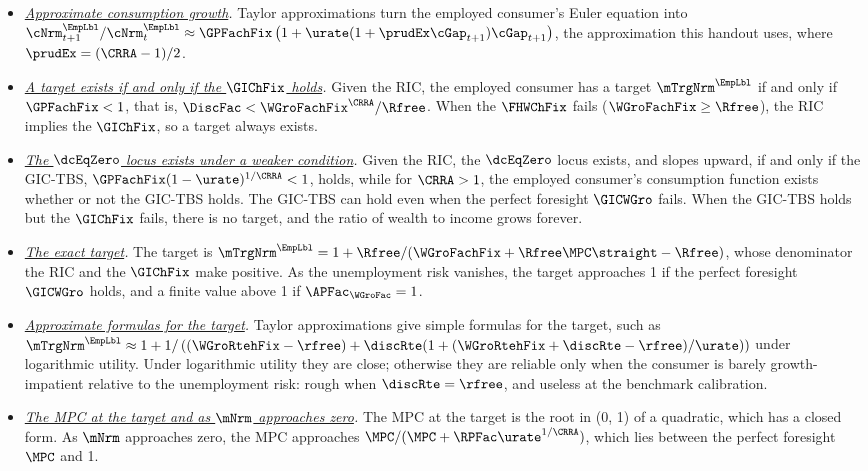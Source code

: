 \documentclass{econark}
\begin{document}
\begin{itemize}
\item \emph{\hyperref[sec:CGroApprox]{Approximate consumption growth}.}  Taylor approximations turn the employed consumer's Euler equation into ${\cNrm}^{\EmpLbl}_{t+1}/{\cNrm}^{\EmpLbl}_{t} \approx \GPFachFix\left(1+\urate(1+\prudEx\cGap_{t+1})\cGap_{t+1}\right)$, the approximation this handout uses, where $\prudEx = (\CRRA-1)/2$.
\item \emph{\hyperref[sec:mTargExists]{A target exists if and only if the $\GIChFix$ holds}.}  Given the RIC, the employed consumer has a target $\mTrgNrm^{\EmpLbl}$ if and only if $\GPFachFix < 1$, that is, $\DiscFac < \WGroFachFix^{\CRRA}/\Rfree$.  When the $\FHWChFix$ fails ($\WGroFachFix \geq \Rfree$), the RIC implies the $\GIChFix$, so a target always exists.
\item \emph{\hyperref[sec:TractableBufferStock-cLocusExists]{The $\dcEqZero$ locus exists under a weaker condition}.}  Given the RIC, the $\dcEqZero$ locus exists, and slopes upward, if and only if the GIC-TBS, $\GPFachFix(1-\urate)^{1/\CRRA} < 1$, holds, while for $\CRRA > 1$, the employed consumer's consumption function exists whether or not the GIC-TBS holds.  The GIC-TBS can hold even when the perfect foresight $\GICWGro$ fails.  When the GIC-TBS holds but the $\GIChFix$ fails, there is no target, and the ratio of wealth to income grows forever.
\item \emph{\hyperref[sec:mTargExact]{The exact target}.}  The target is $\mTrgNrm^{\EmpLbl} = 1 + \Rfree/(\WGroFachFix+\Rfree\MPC\straight-\Rfree)$, whose denominator the RIC and the $\GIChFix$ make positive.  As the unemployment risk vanishes, the target approaches 1 if the perfect foresight $\GICWGro$ holds, and a finite value above 1 if $\APFac_{\WGroFac} = 1$.
\item \emph{\hyperref[sec:mTargApprox]{Approximate formulas for the target}.}  Taylor approximations give simple formulas for the target, such as $\mTrgNrm^{\EmpLbl} \approx 1 + 1/\left((\WGroRtehFix-\rfree)+\discRte(1+(\WGroRtehFix+\discRte-\rfree)/\urate)\right)$ under logarithmic utility.  Under logarithmic utility they are close; otherwise they are reliable only when the consumer is barely growth-impatient relative to the unemployment risk: rough when $\discRte=\rfree$, and useless at the benchmark calibration.
\item \emph{\hyperref[sec:TractableBufferStock-MPC]{The MPC at the target and as $\mNrm$ approaches zero}.}  The MPC at the target is the root in (0, 1) of a quadratic, which has a closed form.  As $\mNrm$ approaches zero, the MPC approaches $\MPC/(\MPC+\RPFac\urate^{1/\CRRA})$, which lies between the perfect foresight $\MPC$ and 1.

\end{itemize}
\end{document}

